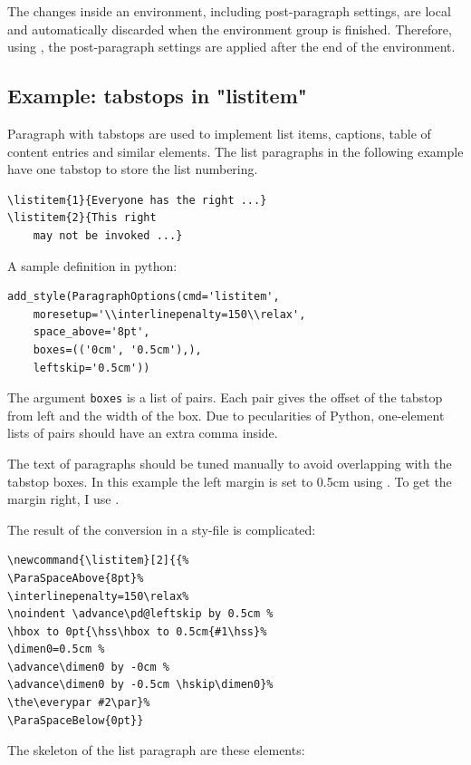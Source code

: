 \documentclass[]{ltugboat}
\begin{document}
The changes inside an environment, including post-paragraph settings, are local and automatically discarded when the environment group is finished. Therefore, using , the post-paragraph settings are applied after the end of the environment.

\subsection{Example: tabstops in "listitem"}

Paragraph with tabstops are used to implement list items, captions, table of content entries and similar elements. The list paragraphs in the following example have one tabstop to store the list numbering.

\begin{verbatim}
\listitem{1}{Everyone has the right ...}
\listitem{2}{This right
    may not be invoked ...}
\end{verbatim}

A sample definition in python:

\begin{verbatim}
add_style(ParagraphOptions(cmd='listitem',
    moresetup='\\interlinepenalty=150\\relax',
    space_above='8pt',
    boxes=(('0cm', '0.5cm'),),
    leftskip='0.5cm'))
\end{verbatim}

The argument \verb|boxes| is a list of pairs. Each pair gives the offset of the tabstop from left and the width of the box. Due to pecularities of Python, one-element lists of pairs should have an extra comma inside.

The text of paragraphs should be tuned manually to avoid overlapping with the tabstop boxes. In this example the left margin is set to 0.5cm using . To get the margin right, I use .

The result of the conversion in a sty-file is complicated:

\begin{verbatim}
\newcommand{\listitem}[2]{{%
\ParaSpaceAbove{8pt}%
\interlinepenalty=150\relax%
\noindent \advance\pd@leftskip by 0.5cm %
\hbox to 0pt{\hss\hbox to 0.5cm{#1\hss}%
\dimen0=0.5cm %
\advance\dimen0 by -0cm %
\advance\dimen0 by -0.5cm \hskip\dimen0}%
\the\everypar #2\par}%
\ParaSpaceBelow{0pt}}
\end{verbatim}

The skeleton of the list paragraph are these elements:
\end{document}
